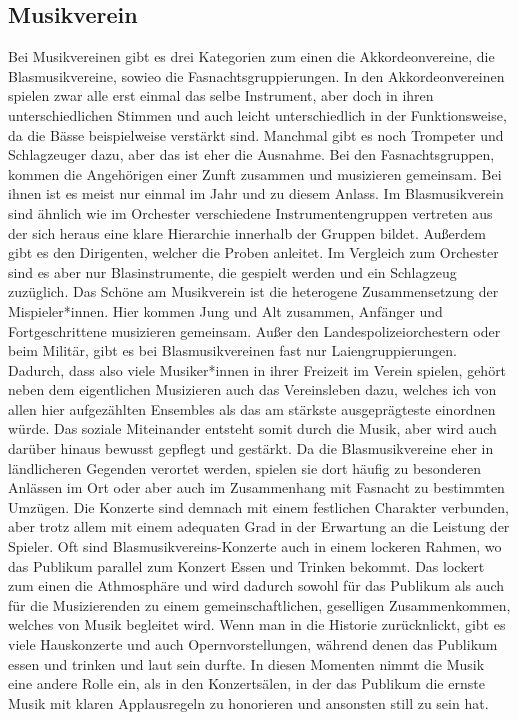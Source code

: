\subsection{Musikverein}
Bei Musikvereinen gibt es drei Kategorien zum einen die Akkordeonvereine, die
Blasmusikvereine, sowieo die Fasnachtsgruppierungen. In den Akkordeonvereinen
spielen zwar alle erst einmal das selbe Instrument, aber doch in ihren
unterschiedlichen Stimmen und auch leicht unterschiedlich in der Funktionsweise,
da die Bässe beispielweise verstärkt sind. Manchmal gibt es noch Trompeter und
Schlagzeuger dazu, aber das ist eher die Ausnahme. Bei den Fasnachtsgruppen,
kommen die Angehörigen einer Zunft zusammen und musizieren gemeinsam. Bei ihnen
ist es meist nur einmal im Jahr und zu diesem Anlass. Im Blasmusikverein sind
ähnlich wie im Orchester verschiedene Instrumentengruppen vertreten aus der sich
heraus eine klare Hierarchie innerhalb der Gruppen bildet. Außerdem gibt es den
Dirigenten, welcher die Proben anleitet. Im Vergleich zum Orchester sind es aber
nur Blasinstrumente, die gespielt werden und ein Schlagzeug zuzüglich. Das
Schöne am Musikverein ist die heterogene Zusammensetzung der Mispieler*innen.
Hier kommen Jung und Alt zusammen, Anfänger und Fortgeschrittene musizieren
gemeinsam. Außer den Landespolizeiorchestern oder beim Militär, gibt es bei
Blasmusikvereinen fast nur Laiengruppierungen. Dadurch, dass also viele
Musiker*innen in ihrer Freizeit im Verein spielen, gehört neben dem eigentlichen
Musizieren auch das Vereinsleben dazu, welches ich von allen hier aufgezählten
Ensembles als das am stärkste ausgeprägteste einordnen würde. Das soziale
Miteinander entsteht somit durch die Musik, aber wird auch darüber hinaus
bewusst gepflegt und gestärkt. Da die Blasmusikvereine eher in ländlicheren
Gegenden verortet werden, spielen sie dort häufig zu besonderen Anlässen im Ort
oder aber auch im Zusammenhang mit Fasnacht zu bestimmten Umzügen. Die Konzerte
sind demnach mit einem festlichen Charakter verbunden, aber trotz allem mit
einem adequaten Grad in der Erwartung an die Leistung der Spieler. Oft sind
Blasmusikvereins-Konzerte auch in einem lockeren Rahmen, wo das Publikum
parallel zum Konzert Essen und Trinken bekommt. Das lockert zum einen die
Athmosphäre und wird dadurch sowohl für das Publikum als auch für die
Musizierenden zu einem gemeinschaftlichen, geselligen Zusammenkommen, welches
von Musik begleitet wird. Wenn man in die Historie zurücknlickt, gibt es viele
Hauskonzerte und auch Opernvorstellungen, während denen das Publikum essen und
trinken und laut sein durfte. In diesen Momenten nimmt die Musik eine andere
Rolle ein, als in den Konzertsälen, in der das Publikum die ernste Musik mit
klaren Applausregeln zu honorieren und ansonsten still zu sein hat. 


